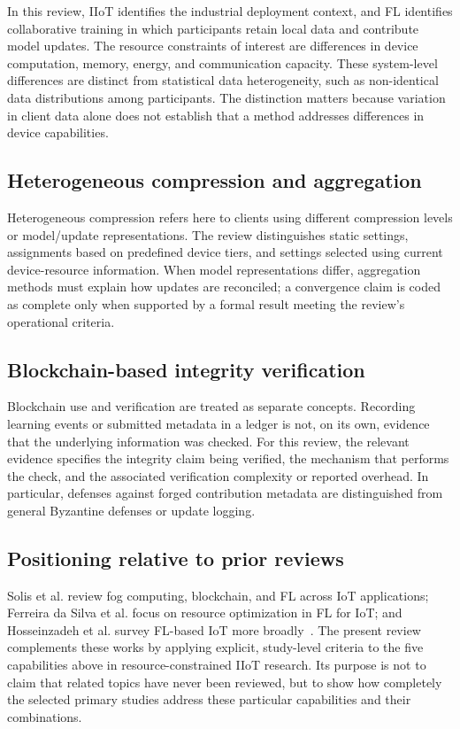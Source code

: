 \documentclass[journal]{IEEEtran}
\begin{document}
In this review, IIoT identifies the industrial deployment context, and FL identifies collaborative training in which participants retain local data and contribute model updates. The resource constraints of interest are differences in device computation, memory, energy, and communication capacity. These system-level differences are distinct from statistical data heterogeneity, such as non-identical data distributions among participants. The distinction matters because variation in client data alone does not establish that a method addresses differences in device capabilities.

\subsection{Heterogeneous compression and aggregation}

Heterogeneous compression refers here to clients using different compression levels or model/update representations. The review distinguishes static settings, assignments based on predefined device tiers, and settings selected using current device-resource information. When model representations differ, aggregation methods must explain how updates are reconciled; a convergence claim is coded as complete only when supported by a formal result meeting the review's operational criteria.

\subsection{Blockchain-based integrity verification}

Blockchain use and verification are treated as separate concepts. Recording learning events or submitted metadata in a ledger is not, on its own, evidence that the underlying information was checked. For this review, the relevant evidence specifies the integrity claim being verified, the mechanism that performs the check, and the associated verification complexity or reported overhead. In particular, defenses against forged contribution metadata are distinguished from general Byzantine defenses or update logging.

\subsection{Positioning relative to prior reviews}
\label{subsec:related-review-position}

Solis et al. review fog computing, blockchain, and FL across IoT applications; Ferreira da Silva et al. focus on resource optimization in FL for IoT; and Hosseinzadeh et al. survey FL-based IoT more broadly~\cite{solis2024synergy,ferreira2023resource,hosseinzadeh2022iot}. The present review complements these works by applying explicit, study-level criteria to the five capabilities above in resource-constrained IIoT research. Its purpose is not to claim that related topics have never been reviewed, but to show how completely the selected primary studies address these particular capabilities and their combinations.
\end{document}
